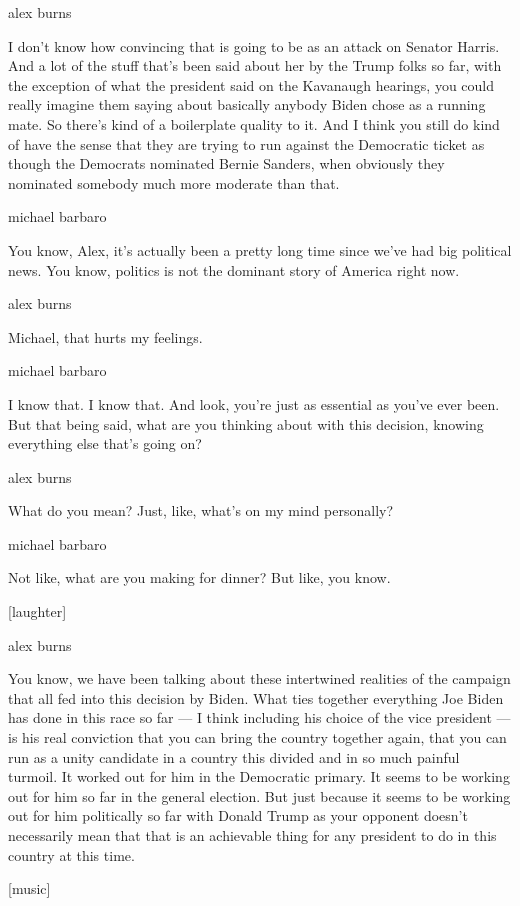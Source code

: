 alex burns

I don't know how convincing that is going to be as an attack on Senator
Harris. And a lot of the stuff that's been said about her by the Trump
folks so far, with the exception of what the president said on the
Kavanaugh hearings, you could really imagine them saying about basically
anybody Biden chose as a running mate. So there's kind of a boilerplate
quality to it. And I think you still do kind of have the sense that they
are trying to run against the Democratic ticket as though the Democrats
nominated Bernie Sanders, when obviously they nominated somebody much
more moderate than that.

michael barbaro

You know, Alex, it's actually been a pretty long time since we've had
big political news. You know, politics is not the dominant story of
America right now.

alex burns

Michael, that hurts my feelings.

michael barbaro

I know that. I know that. And look, you're just as essential as you've
ever been. But that being said, what are you thinking about with this
decision, knowing everything else that's going on?

alex burns

What do you mean? Just, like, what's on my mind personally?

michael barbaro

Not like, what are you making for dinner? But like, you know.

{[}laughter{]}

alex burns

You know, we have been talking about these intertwined realities of the
campaign that all fed into this decision by Biden. What ties together
everything Joe Biden has done in this race so far --- I think including
his choice of the vice president --- is his real conviction that you can
bring the country together again, that you can run as a unity candidate
in a country this divided and in so much painful turmoil. It worked out
for him in the Democratic primary. It seems to be working out for him so
far in the general election. But just because it seems to be working out
for him politically so far with Donald Trump as your opponent doesn't
necessarily mean that that is an achievable thing for any president to
do in this country at this time.

{[}music{]}

